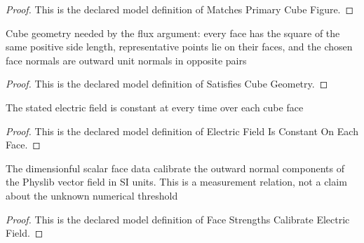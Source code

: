 \begin{proof}
  This is the declared model definition of Matches Primary Cube Figure.
\end{proof}
\begin{definition}
  \label{def:physics:phyx-mini-0840:phyxminiproblems-problemphyxmini0840-satisfiescubegeometry}
  Cube geometry needed by the flux argument: every face has the square of the same positive side length, representative points lie on their faces, and the chosen face normals are outward unit normals in opposite pairs
\end{definition}
\begin{proof}
  This is the declared model definition of Satisfies Cube Geometry.
\end{proof}
\begin{definition}
  \label{def:physics:phyx-mini-0840:phyxminiproblems-problemphyxmini0840-electricfieldisconstantoneachface}
  The stated electric field is constant at every time over each cube face
\end{definition}
\begin{proof}
  This is the declared model definition of Electric Field Is Constant On Each Face.
\end{proof}
\begin{definition}
  \label{def:physics:phyx-mini-0840:phyxminiproblems-problemphyxmini0840-facestrengthscalibrateelectricfield}
  The dimensionful scalar face data calibrate the outward normal components of the Physlib vector field in SI units. This is a measurement relation, not a claim about the unknown numerical threshold
\end{definition}
\begin{proof}
  This is the declared model definition of Face Strengths Calibrate Electric Field.
\end{proof}

